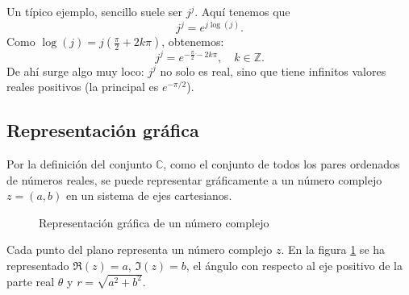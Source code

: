\begin{example}
  Un típico ejemplo, sencillo suele ser $j^j$. Aquí tenemos que
  \[
  j^j = e^{j \log(j)}.
  \]
  Como \(\log(j) = j\left(\tfrac{\pi}{2} + 2k\pi\right)\), obtenemos:
  \[
  j^j = e^{-\tfrac{\pi}{2} - 2k\pi}, \quad k \in \mathbb{Z}.
  \]
  De ahí surge algo muy loco: \(j^j\) no solo es real, sino que tiene infinitos valores reales positivos (la principal es \(e^{-\pi/2}\)).
\end{example}

\subsection{Representación gráfica}

Por la definición del conjunto $\mathbb{C}$, como el conjunto de todos los pares ordenados de números reales, se puede representar gráficamente a un número complejo $z=(a,b)$ en un sistema de ejes cartesianos.
\begin{figure}[ht]
  \centering
  \caption{Representación gráfica de un número complejo}
  \label{fig:grafica_de_un_complejo}
\end{figure}

Cada punto del plano representa un número complejo $z$. En la figura \ref{fig:grafica_de_un_complejo} se ha representado $\Re(z)=a$, $\Im(z)=b$, el ángulo con respecto al eje positivo de la parte real $\theta$ y $r=\sqrt{a^2+b^2}$. 

